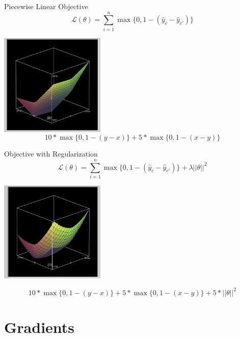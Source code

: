 \documentclass{beamer}
\begin{document}
\begin{frame}{Piecewise Linear Objective}
    \[\mathcal{L}(\theta) = \sum_{i=1}^n \max\{0, 1 - (\hat{y}_{c} - \hat{y}_{c'})\}   \]

  \begin{center}
    \includegraphics[width=5cm]{hingenol2}
    \[10*\max\{0,1 - (y-x)\}+5*\max\{0,1-(x-y)\}\]
  \end{center}
\end{frame}

\begin{frame}{Objective with Regularization}
    \[\mathcal{L}(\theta) = \sum_{i=1}^n \max\{0, 1 - (\hat{y}_{c} - \hat{y}_{c'})\}  + \lambda ||\theta||^2 \]
  \begin{center}

    \includegraphics[width=5cm]{hingel2}

    \[10*\max\{0,1 - (y-x)\}+5*\max\{0,1-(x-y)\}+5*||\theta||^2\]
  \end{center}
\end{frame}

\section{Gradients}
\end{document}
